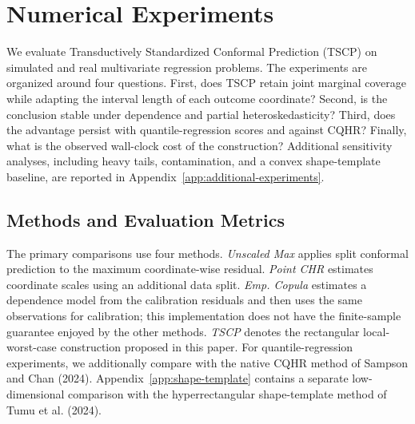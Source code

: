 
\begingroup
\color{blue}

\section{Numerical Experiments}
\label{sec:numerical-experiments}

We evaluate Transductively Standardized Conformal Prediction (TSCP) on
simulated and real multivariate regression problems. The experiments are
organized around four questions. First, does TSCP retain joint marginal
coverage while adapting the interval length of each outcome coordinate?
Second, is the conclusion stable under dependence and partial
heteroskedasticity? Third, does the advantage persist with quantile-regression
scores and against CQHR? Finally, what is the observed wall-clock cost of the
construction? Additional sensitivity analyses, including heavy tails,
contamination, and a convex shape-template baseline, are reported in
Appendix~\ref{app:additional-experiments}.

\subsection{Methods and Evaluation Metrics}
\label{sec:experiment-methods}

The primary comparisons use four methods. \emph{Unscaled Max} applies split
conformal prediction to the maximum coordinate-wise residual. \emph{Point
CHR} estimates coordinate scales using an additional data split. \emph{Emp.
Copula} estimates a dependence model from the calibration residuals and then
uses the same observations for calibration; this implementation does not have
the finite-sample guarantee enjoyed by the other methods. \emph{TSCP} denotes
the rectangular local-worst-case construction proposed in this paper. For
quantile-regression experiments, we additionally compare with the native CQHR
method of Sampson and Chan (2024). Appendix~\ref{app:shape-template} contains a
separate low-dimensional comparison with the hyperrectangular shape-template
method of Tumu et al. (2024).


